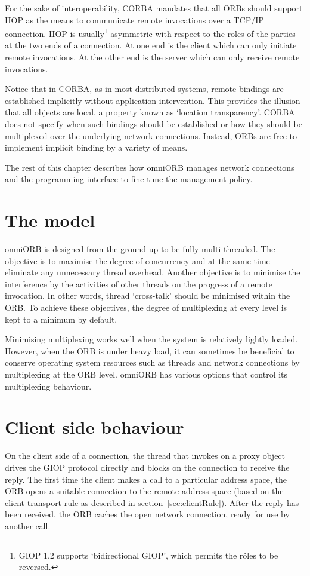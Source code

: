 \documentclass[11pt,oneside,a4paper]{book}
\begin{document}
For the sake of interoperability, CORBA mandates that all ORBs should
support IIOP as the means to communicate remote invocations over a
TCP/IP connection. IIOP is usually\footnote{GIOP 1.2 supports
`bidirectional GIOP', which permits the r\^oles to be reversed.}
asymmetric with respect to the roles of the parties at the two ends of
a connection. At one end is the client which can only initiate remote
invocations. At the other end is the server which can only receive
remote invocations.

Notice that in CORBA, as in most distributed systems, remote bindings
are established implicitly without application intervention. This
provides the illusion that all objects are local, a property known as
`location transparency'. CORBA does not specify when such bindings
should be established or how they should be multiplexed over the
underlying network connections. Instead, ORBs are free to implement
implicit binding by a variety of means.

The rest of this chapter describes how omniORB manages network
connections and the programming interface to fine tune the management
policy.


\section{The model}

omniORB is designed from the ground up to be fully multi-threaded. The
objective is to maximise the degree of concurrency and at the same
time eliminate any unnecessary thread overhead. Another objective is
to minimise the interference by the activities of other threads on the
progress of a remote invocation. In other words, thread `cross-talk'
should be minimised within the ORB. To achieve these objectives, the
degree of multiplexing at every level is kept to a minimum by default.

Minimising multiplexing works well when the system is relatively
lightly loaded. However, when the ORB is under heavy load, it can
sometimes be beneficial to conserve operating system resources such as
threads and network connections by multiplexing at the ORB
level. omniORB has various options that control its multiplexing
behaviour.


\section{Client side behaviour}

On the client side of a connection, the thread that invokes on a proxy
object drives the GIOP protocol directly and blocks on the connection
to receive the reply. The first time the client makes a call to a
particular address space, the ORB opens a suitable connection to the
remote address space (based on the client transport rule as described
in section~\ref{sec:clientRule}). After the reply has been received,
the ORB caches the open network connection, ready for use by another
call.
\end{document}
